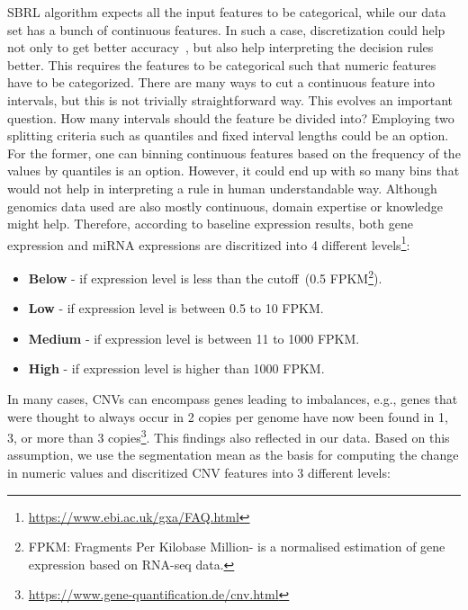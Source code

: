 \hspace*{3.5mm} SBRL algorithm expects all the input features to be categorical, while our data set has a bunch of continuous features. In such a case, discretization could help not only to get better accuracy~\cite{maslove2013discretization}, but also help interpreting the decision rules better. This requires the features to be categorical such that numeric features have to be categorized. There are many ways to cut a continuous feature into intervals, but this is not trivially straightforward way. This evolves an important question. How many intervals should the feature be divided into? Employing two splitting criteria such as quantiles and fixed interval lengths could be an option. For the former, one can binning continuous features based on the frequency of the values by quantiles is an option. However, it could end up with so many bins that would not help in interpreting a rule in human understandable way. Although genomics data used are also mostly continuous, domain expertise or knowledge might help. Therefore, according to baseline expression results, both gene expression and miRNA expressions are discritized into 4 different levels\footnote{\url{https://www.ebi.ac.uk/gxa/FAQ.html}}:

\vspace{-2mm}
\begin{itemize}[noitemsep]
    \item \textbf{Below} - if expression level is less than the cutoff~(0.5 FPKM\footnote{FPKM: Fragments Per Kilobase Million- is a normalised estimation of gene expression based on RNA-seq data.}).
    \item \textbf{Low} - if expression level is between 0.5 to 10 FPKM.
    \item \textbf{Medium} - if expression level is between 11 to 1000 FPKM. 
    \item \textbf{High} - if expression level is higher than 1000 FPKM. 
\end{itemize}

\hspace*{3.5mm} In many cases, CNVs can encompass genes leading to imbalances, e.g., genes that were thought to always occur in 2 copies per genome have now been found in 1, 3, or more than 3  copies\footnote{\url{https://www.gene-quantification.de/cnv.html}}. This findings also reflected in our data. Based on this assumption, we use the segmentation mean as the basis for computing the change in numeric values and discritized CNV features into 3 different levels:  

